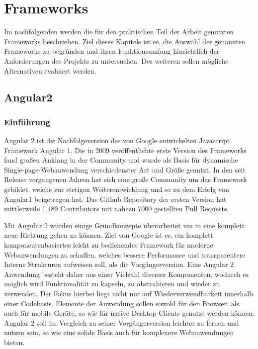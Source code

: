 
\chapter{Frameworks}

Im nachfolgenden werden die für den praktischen Teil der Arbeit genutzten Frameworks beschrieben.
Ziel dieses Kapitels ist es, die Auswahl der genannten Frameworks zu begründen und
ihren Funktionsumfang hinsichtlich der Anforderungen des Projekts zu untersuchen.
Des weiteren sollen mögliche Alternativen evaluiert werden.


\section{Angular2}
\subsection{Einführung}

Angular 2 ist die Nachfolgeversion des von Google entwickelten Javascript Framework Angular 1.
Die in 2009 veröffentlichte erste Version des Frameworks fand großen Anklang in der Community
und wurde als Basis für dynamische Single-page-Webanwendung verschiedenster Art und Größe genutzt.
In den seit Release vergangenen Jahren hat sich eine große Community um das Framework gebildet,
welche zur stetigen Weiterentwicklung und so zu dem Erfolg von Angular1 beigetragen hat.
Das Github Repository der ersten Version hat mittlerweile 1.489 Contributors mit nahezu 7000 gestellten Pull Requests. \cite{ng1-github}

Mit Angular 2 wurden einige Grundkonzepte überarbeitet um in eine komplett neue Richtung gehen zu können.
Ziel von Google ist es, ein komplett komponentenbasiertes leicht zu bedienendes Framework für moderne
Webanwendungen zu schaffen, welches bessere Performance und transparentere Interne Strukturen aufweisen soll, als die Vorgängerversion.
Eine Angular 2 Anwendung besteht daher aus einer Vielzahl diverser Komponenten, wodurch es möglich wird
Funktionalität zu kapseln, zu abstrahieren und wieder zu verwenden. Der Fokus hierbei liegt nicht nur auf Wiederverwendbarkeit innerhalb einer Codebasis.
Elemente der Anwendung sollen sowohl für den Browser, als auch für mobile Geräte, so wie für native Desktop Clients genutzt werden können.
Angular 2 soll im Vergleich zu seiner Vorgängerversion leichter zu lernen und nutzen sein,
so wie eine solide Basis auch für komplexere Webanwendungen bieten. \cite[11-12]{Angular2}

